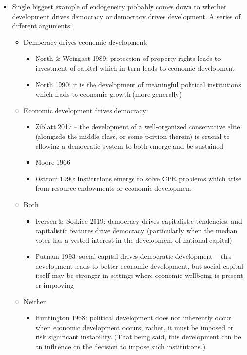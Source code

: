 \documentclass[12pt]{article}
\begin{document}
\begin{itemize}
    \item Single biggest example of endogeneity probably comes down to whether development drives democracy or democracy drives development. A series of different arguments:
    \begin{itemize}
        \item Democracy drives economic development:
        \begin{itemize}
            \item North \& Weingast 1989: protection of property rights leads to investment of capital which in turn leads to economic development
            \item North 1990: it is the development of meaningful political institutions which leads to economic growth (more generally)
        \end{itemize}
        \item Economic development drives democracy:
        \begin{itemize}
            \item Ziblatt 2017 -- the development of a well-organized conservative elite (alongisde the middle class, or some portion therein) is crucial to allowing a democratic system to both emerge and be sustained
            \item Moore 1966
            \item Ostrom 1990: institutions emerge to solve CPR problems which arise from resource endowments or economic development
        \end{itemize}
        \item Both
        \begin{itemize}
            \item Iversen \& Soskice 2019: democracy drives capitalistic tendencies, and capitalistic features drive democracy (particularly when the median voter has a vested interest in the development of national capital)
            \item Putnam 1993: social capital drives democratic development -- this development leads to better economic development, but social capital itself may be stronger in settings where economic wellbeing is present or improving
        \end{itemize}
        \item Neither
        \begin{itemize}
            \item Huntington 1968: political development does not inherently occur when economic development occurs; rather, it must be imposed or risk significant instability. (That being said, this development can be an influence on the decision to impose such institutions.)

\end{itemize}
\end{itemize}
\end{itemize}
\end{document}
